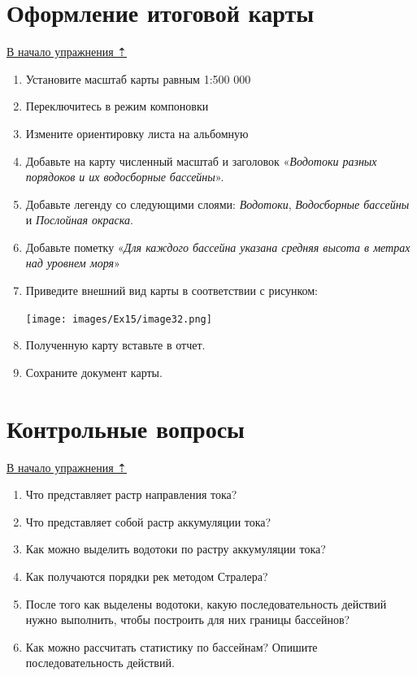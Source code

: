 \documentclass[12pt,]{book}
\begin{document}
\hypertarget{dem-result}{%
\section{Оформление итоговой карты}\label{dem-result}}

\protect\hyperlink{dem}{В начало упражнения ⇡}

\begin{enumerate}
\def\labelenumi{\arabic{enumi}.}
\item
  Установите масштаб карты равным 1:500 000
\item
  Переключитесь в режим компоновки
\item
  Измените ориентировку листа на альбомную
\item
  Добавьте на карту численный масштаб и заголовок «\emph{Водотоки разных порядоков и их водосборные бассейны}».
\item
  Добавьте легенду со следующими слоями: \emph{Водотоки}, \emph{Водосборные бассейны} и \emph{Послойная окраска}.
\item
  Добавьте пометку «\emph{Для каждого бассейна указана средняя высота в метрах над уровнем моря}»
\item
  Приведите внешний вид карты в соответствии с рисунком:

  \texttt{[image: images/Ex15/image32.png]}
\item
  Полученную карту вставьте в отчет.
\item
  Сохраните документ карты.
\end{enumerate}

\hypertarget{dem-questions}{%
\section{Контрольные вопросы}\label{dem-questions}}

\protect\hyperlink{dem}{В начало упражнения ⇡}

\begin{enumerate}
\def\labelenumi{\arabic{enumi}.}
\item
  Что представляет растр направления тока?
\item
  Что представляет собой растр аккумуляции тока?
\item
  Как можно выделить водотоки по растру аккумуляции тока?
\item
  Как получаются порядки рек методом Стралера?
\item
  После того как выделены водотоки, какую последовательность действий нужно выполнить, чтобы построить для них границы бассейнов?
\item
  Как можно рассчитать статистику по бассейнам? Опишите последовательность действий.
\end{enumerate}
\end{document}

